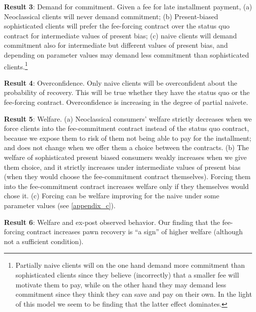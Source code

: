\documentclass[oneside,11pt]{article}
\begin{document}
\vspace{.1in}
\noindent \textbf{Result 3}: Demand for commitment. Given a fee for late installment payment, (a) Neoclassical clients will never demand commitment; (b) Present-biased sophisticated clients will prefer the fee-forcing contract over the status quo contract for intermediate values of present bias; (c) naive clients will demand commitment also for intermediate but different values of present bias, and depending on parameter values may demand less commitment than sophisticated clients.\footnote{Partially naive clients will on the one hand demand more commitment than sophisticated clients since they believe (incorrectly) that a smaller fee will motivate them to pay, while on the other hand they may demand less commitment since they think they can save and pay on their own. In the light of this model we seem to be finding that the latter effect dominates. %
}

\vspace{.1in}
\noindent \textbf{Result 4}: Overconfidence. Only naive clients will be overconfident about the probability of recovery. This will be true whether they have the status quo or the fee-forcing contract. Overconfidence is increasing in the degree of partial naivete.

\vspace{.1in}
\noindent \textbf{Result 5}: Welfare. (a) Neoclassical consumers' welfare strictly decreases when we force clients into the fee-commitment contract instead of the status quo contract, because we expose them to risk of them not being able to pay for the installment; and does not change when we offer them a choice between the contracts. (b) The welfare of sophisticated present biased consumers weakly increases when we give them choice, and it strictly increases  under intermediate values of present bias (when they would choose the fee-commitment contract themselves). Forcing them into the fee-commitment contract increases welfare only if they themselves would chose it. (c) Forcing can be welfare improving for the naive under some parameter values (see \ref{appendix_c}). 

\vspace{.1in}
\noindent \textbf{Result 6}: Welfare and ex-post observed behavior. Our finding that the fee-forcing contract increases pawn recovery is ``a sign'' of higher welfare (although not a sufficient condition).
\end{document}
